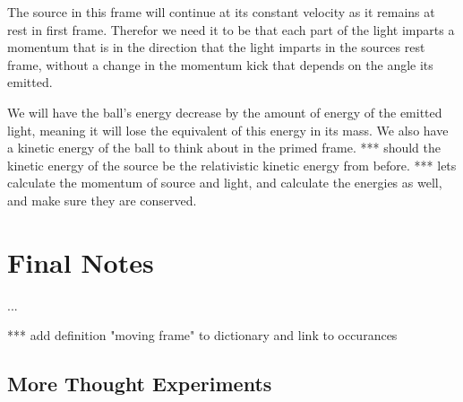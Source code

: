 The source in this frame will continue at its constant velocity as it remains at rest in first frame.
Therefor we need it to be that each part of the light imparts a momentum that is in the direction that the light imparts in the sources rest frame, without a change in the momentum kick that depends on the angle its emitted.

We will have the ball's energy decrease by the amount of energy of the emitted light, meaning it will lose the equivalent of this energy in its mass.
We also have a kinetic energy of the ball to think about in the primed frame.
*** should the kinetic energy of the source be the relativistic kinetic energy from before.
*** lets calculate the momentum of source and light, and calculate the energies as well, and make sure they are conserved.



\chapter{Final Notes}\label{ch: Recap}

...

*** add definition "moving frame" to dictionary and link to occurances

\section{More Thought Experiments}\label{sect: More Thought Experiments}




